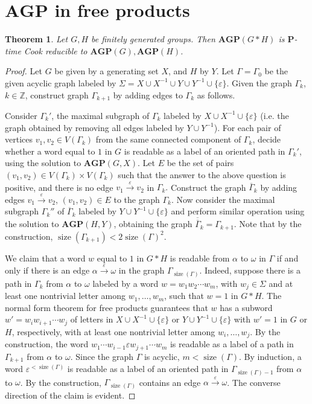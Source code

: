 \documentclass[10pt]{amsart}
\newcommand{\li}{\noindent\color{blue} Liza: }{}
\newtheorem{theorem}{Theorem}[section]
\theoremstyle{definition}
\DeclareMathOperator{\size}{{size}}
\def\P{{\mathbf{P}}}
\def\AGP{{\mathbf{AGP}}}
\begin{document}
\section{$\AGP$ in free products}\label{sec:free_prod}
\begin{theorem}\label{th:agp_to_factors}
Let $G,H$ be finitely generated groups. Then $\AGP(G*H)$ is $\P$-time Cook reducible to $\AGP(G),\AGP(H)$.
\end{theorem}
\begin{proof}
Let $G$ be given by a generating set $X$, and $H$ by $Y$. Let $\Gamma=\Gamma_0$ be the given acyclic graph labeled by $\Sigma=X\cup X^{-1}\cup Y\cup Y^{-1}\cup\{\varepsilon\}$. Given the graph $\Gamma_k$, $k\in\mathbb Z$, construct graph $\Gamma_{k+1}$ by adding edges to $\Gamma_k$ as follows.

Consider $\Gamma_{k}'$, the maximal subgraph of $\Gamma_k$ labeled by  $X\cup X^{-1}\cup \{\varepsilon\}$ (i.e. the graph obtained by removing all edges labeled by $Y\cup Y^{-1}$).
For each pair of vertices $v_1,v_2\in V(\Gamma_k)$ from the same connected component of $\Gamma_k$, decide whether a word equal to $1$ in $G$ is readable as a label of an oriented path in $\Gamma_k'$, using the solution to $\AGP(G,X)$.
Let $E$ be the set of pairs $(v_1,v_2)\in V(\Gamma_k)\times V(\Gamma_k)$ such that the answer to the above question is positive, and there is no edge $v_1\overset{\varepsilon}{\to}v_2$ in $\Gamma_k.$ Construct the graph $\overline{\Gamma}_k$ by adding edges  $v_1\overset{\varepsilon}{\to}v_2$, $(v_1,v_2)\in E$ to the graph $\Gamma_k$.
Now consider the maximal subgraph $\Gamma_k''$ of $\overline{\Gamma}_k$ labeled by $Y\cup Y^{-1}\cup \{\varepsilon\}$ and perform similar operation using the solution to $\AGP(H,Y)$, obtaining the graph $\overline{\overline{\Gamma}}_k=\Gamma_{k+1}$.
Note that by the construction, $\size(\Gamma_{k+1})<2\size(\Gamma)^2$.

We claim that a word $w$ equal to $1$ in $G*H$ is readable from $\alpha$ to $\omega$ in $\Gamma$ if and only if there is an edge $\alpha\overset{\varepsilon}{\to}\omega$ in the graph $\Gamma_{\size(\Gamma)}$.
Indeed, suppose there is a path in $\Gamma_k$ from $\alpha$ to $\omega$ labeled by a word $w=w_1w_2\cdots w_m$, with $w_j\in \Sigma$ and at least one nontrivial letter among $w_1,\ldots, w_m$, such that $w=1$ in $G*H$.
The normal form theorem for free products guarantees that $w$ has a subword $w'=w_iw_{i+1}\cdots w_j$ of letters in $X\cup X^{-1}\cup \{\varepsilon\}$ or $Y\cup Y^{-1}\cup \{\varepsilon\}$ with $w'=1$ in $G$ or $H$, respectively, with at least one nontrivial letter among $w_i,\ldots,w_j$.
By the construction, the word $w_1\cdots w_{i-1}\varepsilon w_{j+1}\cdots w_m$ is readable as a label of a path in $\Gamma_{k+1}$ from $\alpha$ to $\omega$. Since the graph $\Gamma$ is acyclic, $m< \size(\Gamma)$.
By induction, a word $\varepsilon^{<\size(\Gamma)}$ is readable as a label of an oriented path in $\Gamma_{\size(\Gamma)-1}$ from $\alpha$ to $\omega$.
By the construction, $\Gamma_{\size(\Gamma)}$ contains an edge $\alpha\overset{\varepsilon}{\to}\omega$.
The converse direction of the claim is evident.
\end{proof}
\end{document}

